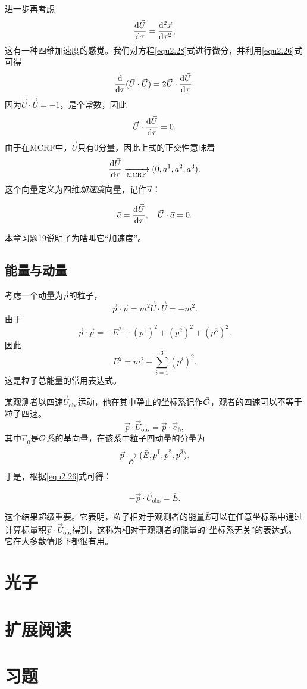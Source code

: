 进一步再考虑
\[
    \frac{\mathrm{d} \vec{U}}{\mathrm{d} \tau} = \frac{\mathrm{d}^2 \vec{x}}{\mathrm{d} \tau^2},
\]
这有一种四维加速度的感觉。我们对方程\eqref{equ2.28}式进行微分，并利用\eqref{equ2.26}式可得
\[
    \frac{\mathrm{d}}{\mathrm{d} \tau} (\vec{U} \cdot \vec{U}) = 2 \vec{U} \cdot \frac{\mathrm{d} \vec{U}}{\mathrm{d} \tau}.
\]
因为$\vec{U} \cdot \vec{U} = -1$，是个常数，因此
\[
    \vec{U} \cdot \frac{\mathrm{d} \vec{U}}{\mathrm{d} \tau} = 0.
\]
由于在MCRF中，$\vec{U}$只有0分量，因此上式的正交性意味着
\[
    \frac{\mathrm{d} \vec{U}}{\mathrm{d} \tau} \xrightarrow[\text{MCRF}]{ } (0, a^1, a^2, a^3).
\]
这个向量定义为四维\textit{加速度}向量，记作$\vec{a}$：
\begin{shaded}
\begin{equation}
    \vec{a} = \frac{\mathrm{d} \vec{U}}{\mathrm{d} \tau}, \quad \vec{U} \cdot \vec{a} = 0.
\label{equ2.32}
\end{equation}
\end{shaded}
本章习题19说明了为啥叫它“加速度”。

\subsection*{能量与动量}
考虑一个动量为$\vec{p}$的粒子，
\begin{equation}
    \vec{p} \cdot \vec{p} = m^2 \vec{U} \cdot \vec{U} = -m^2.
\label{equ2.33}
\end{equation}
由于
\[
    \vec{p} \cdot \vec{p} = -E^2 + (p^1)^2 + (p^2)^2 + (p^3)^2.
\]
因此
\begin{equation}
    E^2 = m^2 + \sum_{i = 1}^3 (p^i)^2.
\label{equ2.34}
\end{equation}
这是粒子总能量的常用表达式。

某观测者以四速$\vec{U}_{\text{obs}}$运动，他在其中静止的坐标系记作$\bar{\mathcal{O}}$，观者的四速可以不等于粒子四速。
\[
    \vec{p} \cdot \vec{U}_{\text{obs}} = \vec{p} \cdot \vec{e}_{\bar{0}},
\]
其中$\vec{e}_{\bar{0}}$是$\bar{\mathcal{O}}$系的基向量，在该系中粒子四动量的分量为
\[
    \vec{p} \xrightarrow[\bar{\mathcal{O}}]{ } (\bar{E}, p^{\bar{1}}, p^{\bar{2}}, p^{\bar{3}}).
\]
于是，根据\eqref{equ2.26}式可得：
\begin{shaded}
\begin{equation}
    -\vec{p} \cdot \vec{U}_{\text{obs}} = \bar{E}.
\label{equ2.35}
\end{equation}
\end{shaded}
这个结果超级重要。它表明，粒子相对于观测者的能量$\bar{E}$可以在任意坐标系中通过计算标量积$\vec{p} \cdot \vec{U}_{\text{obs}}$得到，这称为相对于观测者的能量的“坐标系无关”的表达式。它在大多数情形下都很有用。

\section{光子}
\label{sec2.7}

\section{扩展阅读}
\label{sec2.8}

\section{习题}
\label{sec2.9}